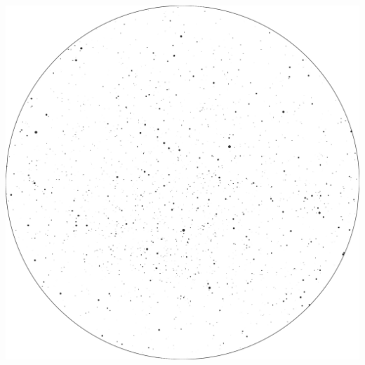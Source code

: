 \documentclass{./SAS-class-skygen}
\begin{document}
	\vspace{0.5cm}
    \begin{center}
    \includegraphics[width=\textwidth]{./pics/skychart9.png}
    \end{center}
    
    
\end{document}
